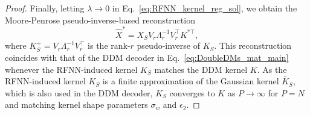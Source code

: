\documentclass{article}
\begin{document}
\begin{proof}
Finally, letting $\lambda\to0$ in Eq.~\eqref{eq:RFNN_kernel_reg_sol}, we obtain the Moore-Penrose pseudo-inverse-based reconstruction
\begin{equation}
    \widehat{X}^* = X_S V_r \Lambda_r^{-1}V_r^\top K^{*\top},
\end{equation}
where $K_S^{+}=V_r \Lambda_r^{-1}V_r^\top$ is the rank-$r$ pseudo-inverse of $K_S$. This reconstruction coincides with that of the DDM decoder in Eq.~\eqref{eq:DoubleDMs_mat_main} whenever the RFNN-induced kernel $K_S$ matches the DDM kernel $K$. As the RFNN-induced kernel $K_S$ is a finite approximation of the Gaussian kernel $\bar{K}_S$, which is also used in the DDM decoder, $K_S$ converges to $K$ as $P\to \infty$ for $P=N$ and matching kernel shape parameters $\sigma_w$ and $\epsilon_2$.
\end{proof}
\end{document}
